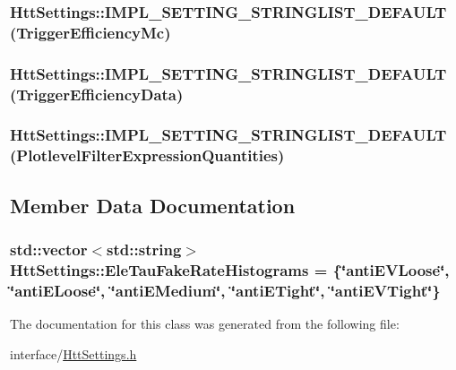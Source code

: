 \label{classHttSettings_a2e6b5492e8fb2a12a4acdd8239e8635e}
\hypertarget{classHttSettings_ac488a7041dd0ab6dd4d6898c481bece4}{
\subsubsection[{IMPL\_\-SETTING\_\-STRINGLIST\_\-DEFAULT}]{\setlength{\rightskip}{0pt plus 5cm}HttSettings::IMPL\_\-SETTING\_\-STRINGLIST\_\-DEFAULT (TriggerEfficiencyMc)}}
\label{classHttSettings_ac488a7041dd0ab6dd4d6898c481bece4}
\hypertarget{classHttSettings_a8bff861fd341d793e6f72b573796b592}{
\subsubsection[{IMPL\_\-SETTING\_\-STRINGLIST\_\-DEFAULT}]{\setlength{\rightskip}{0pt plus 5cm}HttSettings::IMPL\_\-SETTING\_\-STRINGLIST\_\-DEFAULT (TriggerEfficiencyData)}}
\label{classHttSettings_a8bff861fd341d793e6f72b573796b592}
\hypertarget{classHttSettings_a19b1c2be0f5467f754d6c4c4283ca087}{
\subsubsection[{IMPL\_\-SETTING\_\-STRINGLIST\_\-DEFAULT}]{\setlength{\rightskip}{0pt plus 5cm}HttSettings::IMPL\_\-SETTING\_\-STRINGLIST\_\-DEFAULT (PlotlevelFilterExpressionQuantities)}}
\label{classHttSettings_a19b1c2be0f5467f754d6c4c4283ca087}


\subsection{Member Data Documentation}
\hypertarget{classHttSettings_ae13115ebff12caecd683ea97cadecafc}{
\subsubsection[{EleTauFakeRateHistograms}]{\setlength{\rightskip}{0pt plus 5cm}std::vector$<$std::string$>$ {\bf HttSettings::EleTauFakeRateHistograms} = \{\char`\"{}antiEVLoose\char`\"{}, \char`\"{}antiELoose\char`\"{}, \char`\"{}antiEMedium\char`\"{}, \char`\"{}antiETight\char`\"{}, \char`\"{}antiEVTight\char`\"{}\}}}
\label{classHttSettings_ae13115ebff12caecd683ea97cadecafc}


The documentation for this class was generated from the following file:\begin{DoxyCompactItemize}
\item 
interface/\hyperlink{HttSettings_8h}{HttSettings.h}\end{DoxyCompactItemize}
